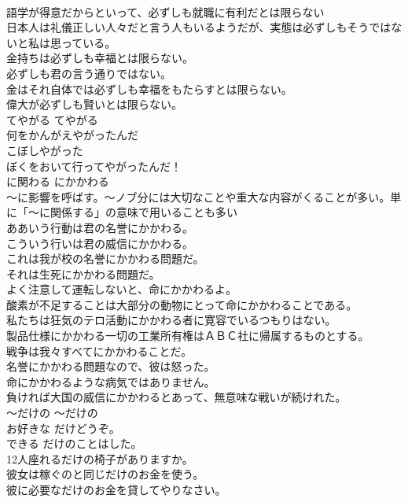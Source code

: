 \documentclass[8pt]{extreport}
\begin{document}
\begin{CJK}{UTF8}{min}
\\	語学が得意だからといって、必ずしも就職に有利だとは限らない  
\\	日本人は礼儀正しい人々だと言う人もいるようだが、実態は必ずしもそうではないと私は思っている。  
\\	金持ちは必ずしも幸福とは限らない。  
\\	必ずしも君の言う通りではない。   
\\	金はそれ自体では必ずしも幸福をもたらすとは限らない。   
\\	偉大が必ずしも賢いとは限らない。  
\\	てやがる	てやがる	
\\	何をかんがえやがったんだ   
\\	こぼしやがった   
\\	ぼくをおいて行ってやがったんだ！  
\\	に関わる	にかかわる	
\\	〜に影響を呼ばす。〜ノブ分には大切なことや重大な内容がくることが多い。単に「〜に関係する」の意味で用いることも多い	
\\	ああいう行動は君の名誉にかかわる。   
\\	こういう行いは君の威信にかかわる。   
\\	これは我が校の名誉にかかわる問題だ。   
\\	それは生死にかかわる問題だ。   
\\	よく注意して運転しないと、命にかかわるよ。   
\\	酸素が不足することは大部分の動物にとって命にかかわることである。   
\\	私たちは狂気のテロ活動にかかわる者に寛容でいるつもりはない。   
\\	製品仕様にかかわる一切の工業所有権はＡＢＣ社に帰属するものとする。   
\\	戦争は我々すべてにかかわることだ。   
\\	名誉にかかわる問題なので、彼は怒った。   
\\	命にかかわるような病気ではありません。   
\\	負ければ大国の威信にかかわるとあって、無意味な戦いが続けれた。  
\\	〜だけの	〜だけの	
\\	お好きな だけどうぞ。  
\\	できる だけのことはした。  
\\	12人座れるだけの椅子がありますか。  
\\	彼女は稼ぐのと同じだけのお金を使う。  
\\	彼に必要なだけのお金を貸してやりなさい。  

\end{CJK}
\end{document}
